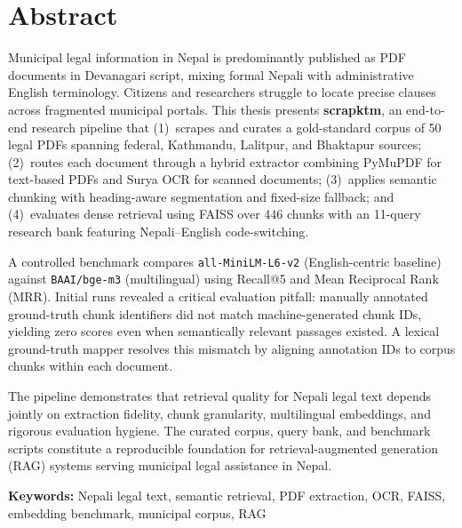 \chapter*{Abstract}
Municipal legal information in Nepal is predominantly published as PDF documents in Devanagari script, mixing formal Nepali with administrative English terminology. Citizens and researchers struggle to locate precise clauses across fragmented municipal portals. This thesis presents \textbf{scrapktm}, an end-to-end research pipeline that (1)~scrapes and curates a gold-standard corpus of 50 legal PDFs spanning federal, Kathmandu, Lalitpur, and Bhaktapur sources; (2)~routes each document through a hybrid extractor combining PyMuPDF for text-based PDFs and Surya OCR for scanned documents; (3)~applies semantic chunking with heading-aware segmentation and fixed-size fallback; and (4)~evaluates dense retrieval using FAISS over 446 chunks with an 11-query research bank featuring Nepali--English code-switching.

A controlled benchmark compares \texttt{all-MiniLM-L6-v2} (English-centric baseline) against \texttt{BAAI/bge-m3} (multilingual) using Recall@5 and Mean Reciprocal Rank (MRR). Initial runs revealed a critical evaluation pitfall: manually annotated ground-truth chunk identifiers did not match machine-generated chunk IDs, yielding zero scores even when semantically relevant passages existed. A lexical ground-truth mapper resolves this mismatch by aligning annotation IDs to corpus chunks within each document.

The pipeline demonstrates that retrieval quality for Nepali legal text depends jointly on extraction fidelity, chunk granularity, multilingual embeddings, and rigorous evaluation hygiene. The curated corpus, query bank, and benchmark scripts constitute a reproducible foundation for retrieval-augmented generation (RAG) systems serving municipal legal assistance in Nepal.

\textbf{Keywords:} Nepali legal text, semantic retrieval, PDF extraction, OCR, FAISS, embedding benchmark, municipal corpus, RAG

\tableofcontents
\listoffigures
\listoftables
\cleardoublepage
{}
